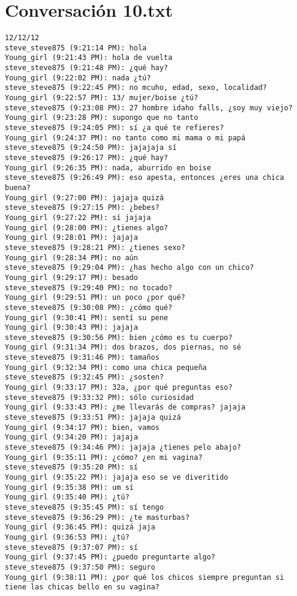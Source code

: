 \section{Conversaci\'on 10.txt}

\begin{verbatim}
12/12/12
steve_steve875 (9:21:14 PM): hola
Young_girl (9:21:43 PM): hola de vuelta
steve_steve875 (9:21:48 PM): ¿qué hay?
Young_girl (9:22:02 PM): nada ¿tú?
steve_steve875 (9:22:45 PM): no mcuho, edad, sexo, localidad?
Young_girl (9:22:57 PM): 13/ mujer/boise ¿tú?
steve_steve875 (9:23:08 PM): 27 hombre idaho falls, ¿soy muy viejo?
Young_girl (9:23:28 PM): supongo que no tanto
steve_steve875 (9:24:05 PM): sí ¿a qué te refieres?
Young_girl (9:24:37 PM): no tanto como mi mama o mi papá
steve_steve875 (9:24:50 PM): jajajaja sí
steve_steve875 (9:26:17 PM): ¿qué hay?
Young_girl (9:26:35 PM): nada, aburrido en boise
steve_steve875 (9:26:49 PM): eso apesta, entonces ¿eres una chica buena?
Young_girl (9:27:00 PM): jajaja quizá
steve_steve875 (9:27:15 PM): ¿bebes?
Young_girl (9:27:22 PM): sí jajaja
Young_girl (9:28:00 PM): ¿tienes algo?
Young_girl (9:28:01 PM): jajaja
steve_steve875 (9:28:21 PM): ¿tienes sexo?
Young_girl (9:28:34 PM): no aún
steve_steve875 (9:29:04 PM): ¿has hecho algo con un chico?
Young_girl (9:29:17 PM): besado
steve_steve875 (9:29:40 PM): no tocado?
Young_girl (9:29:51 PM): un poco ¿por qué?
steve_steve875 (9:30:08 PM): ¿cómo qué?
Young_girl (9:30:41 PM): sentí su pene
Young_girl (9:30:43 PM): jajaja
steve_steve875 (9:30:56 PM): bien ¿cómo es tu cuerpo?
Young_girl (9:31:34 PM): dos brazos, dos piernas, no sé
steve_steve875 (9:31:46 PM): tamaños
Young_girl (9:32:34 PM): como una chica pequeña
steve_steve875 (9:32:45 PM): ¿sosten?
Young_girl (9:33:17 PM): 32a, ¿por qué preguntas eso?
steve_steve875 (9:33:32 PM): sólo curiosidad
Young_girl (9:33:43 PM): ¿me llevarás de compras? jajaja
steve_steve875 (9:33:51 PM): jajaja quizá
Young_girl (9:34:17 PM): bien, vamos
Young_girl (9:34:20 PM): jajaja
steve_steve875 (9:34:46 PM): jajaja ¿tienes pelo abajo?
Young_girl (9:35:11 PM): ¿cómo? ¿en mi vagina?
steve_steve875 (9:35:20 PM): sí
Young_girl (9:35:22 PM): jajaja eso se ve diveritido
Young_girl (9:35:38 PM): um sí
Young_girl (9:35:40 PM): ¿tú?
steve_steve875 (9:35:45 PM): sí tengo
steve_steve875 (9:36:29 PM): ¿te masturbas?
Young_girl (9:36:45 PM): quizá jaja
Young_girl (9:36:53 PM): ¿tú?
steve_steve875 (9:37:07 PM): sí
Young_girl (9:37:45 PM): ¿puedo preguntarte algo?
steve_steve875 (9:37:50 PM): seguro
Young_girl (9:38:11 PM): ¿por qué los chicos siempre preguntan si tiene las chicas bello en su vagina?

\end{verbatim}
